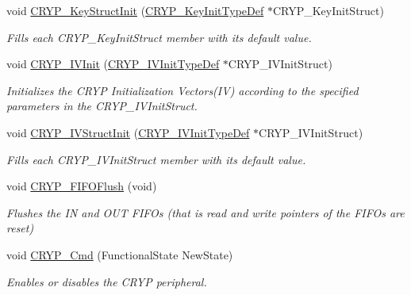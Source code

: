\begin{DoxyCompactItemize}
void \hyperlink{group___c_r_y_p___group1_gaeecd86b00d0d0137d97b06108789bcb2}{C\-R\-Y\-P\-\_\-\-Key\-Struct\-Init} (\hyperlink{struct_c_r_y_p___key_init_type_def}{C\-R\-Y\-P\-\_\-\-Key\-Init\-Type\-Def} $\ast$C\-R\-Y\-P\-\_\-\-Key\-Init\-Struct)
\begin{DoxyCompactList}\small\item\em Fills each C\-R\-Y\-P\-\_\-\-Key\-Init\-Struct member with its default value. \end{DoxyCompactList}\item 
void \hyperlink{group___c_r_y_p___group1_ga133964b50a07db3a32864308f6355a8b}{C\-R\-Y\-P\-\_\-\-I\-V\-Init} (\hyperlink{struct_c_r_y_p___i_v_init_type_def}{C\-R\-Y\-P\-\_\-\-I\-V\-Init\-Type\-Def} $\ast$C\-R\-Y\-P\-\_\-\-I\-V\-Init\-Struct)
\begin{DoxyCompactList}\small\item\em Initializes the C\-R\-Y\-P Initialization Vectors(\-I\-V) according to the specified parameters in the C\-R\-Y\-P\-\_\-\-I\-V\-Init\-Struct. \end{DoxyCompactList}\item 
void \hyperlink{group___c_r_y_p___group1_ga58899074e08bbd65f2ed304cf0f42987}{C\-R\-Y\-P\-\_\-\-I\-V\-Struct\-Init} (\hyperlink{struct_c_r_y_p___i_v_init_type_def}{C\-R\-Y\-P\-\_\-\-I\-V\-Init\-Type\-Def} $\ast$C\-R\-Y\-P\-\_\-\-I\-V\-Init\-Struct)
\begin{DoxyCompactList}\small\item\em Fills each C\-R\-Y\-P\-\_\-\-I\-V\-Init\-Struct member with its default value. \end{DoxyCompactList}\item 
void \hyperlink{group___c_r_y_p___group1_ga23ada9d9464e1362299d7612a1409a57}{C\-R\-Y\-P\-\_\-\-F\-I\-F\-O\-Flush} (void)
\begin{DoxyCompactList}\small\item\em Flushes the I\-N and O\-U\-T F\-I\-F\-Os (that is read and write pointers of the F\-I\-F\-Os are reset) \end{DoxyCompactList}\item 
void \hyperlink{group___c_r_y_p___group1_gad39ccd9b1f2e088e3a227d7a1c410d7c}{C\-R\-Y\-P\-\_\-\-Cmd} (Functional\-State New\-State)
\begin{DoxyCompactList}\small\item\em Enables or disables the C\-R\-Y\-P peripheral. \end{DoxyCompactList}\end{DoxyCompactItemize}


